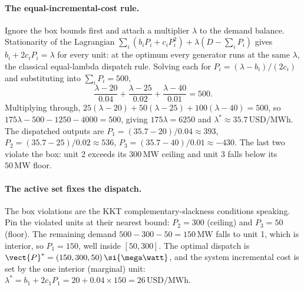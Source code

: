 \paragraph{The equal-incremental-cost rule.}
Ignore the box bounds first and attach a multiplier $\lambda$ to the
demand balance. Stationarity of the Lagrangian $\sum_{i}(b_{i} P_{i} +
c_{i} P_{i}^{2}) + \lambda(D - \sum_{i} P_{i})$ gives $b_{i} + 2 c_{i}
P_{i} = \lambda$ for every unit: at the optimum every generator runs at
the same  $\lambda$, the classical
equal-lambda dispatch rule. Solving each for $P_{i} = (\lambda -
b_{i})/(2 c_{i})$ and substituting into $\sum_{i} P_{i} = 500$,
\[
\frac{\lambda - 20}{0.04} + \frac{\lambda - 25}{0.02} +
\frac{\lambda - 40}{0.01} = 500.
\]
Multiplying through, $25(\lambda - 20) + 50(\lambda - 25) + 100(\lambda
- 40) = 500$, so $175 \lambda - 500 - 1250 - 4000 = 500$, giving
$175 \lambda = 6250$ and $\lambda^{*} \approx 35.7\,\text{USD/MWh}$.
The dispatched outputs are $P_{1} = (35.7 - 20)/0.04 \approx 393$,
$P_{2} = (35.7 - 25)/0.02 \approx 536$, $P_{3} = (35.7 - 40)/0.01
\approx -430$. The last two violate the box: unit 2 exceeds its
$300\,\si{\mega\watt}$ ceiling and unit 3 falls below its
$50\,\si{\mega\watt}$ floor.

\paragraph{The active set fixes the dispatch.}
The box violations are the KKT complementary-slackness conditions
speaking. Pin the violated units at their nearest bound: $P_{2} = 300$
(ceiling) and $P_{3} = 50$ (floor). The remaining demand $500 - 300 -
50 = 150\,\si{\mega\watt}$ falls to unit 1, which is interior, so
$P_{1} = 150$, well inside $[50, 300]$. The optimal dispatch is
$\vect{P}^{*} = (150, 300, 50)\,\si{\mega\watt}$, and the system
incremental cost is set by the one interior (marginal) unit: $\lambda^{*}
= b_{1} + 2 c_{1} P_{1} = 20 + 0.04 \times 150 = 26\,\text{USD/MWh}$.

